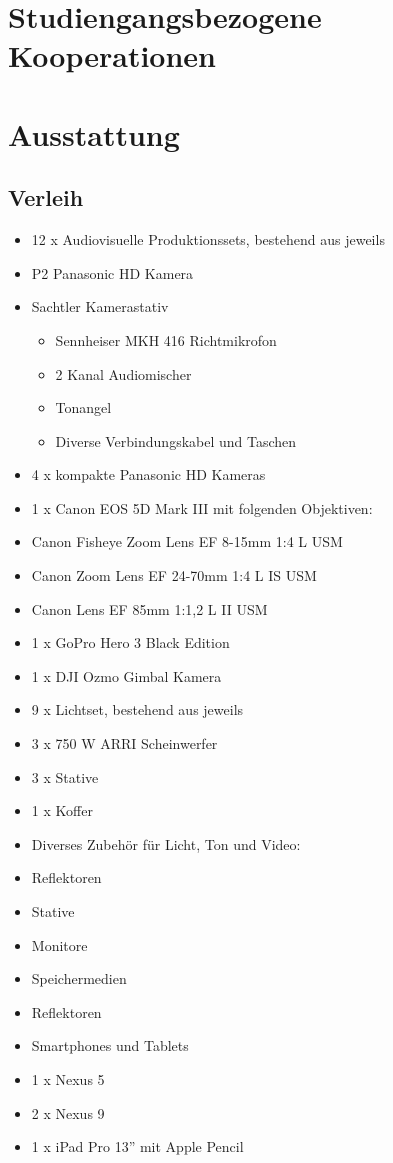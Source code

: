 \chapter{Studiengangsbezogene
Kooperationen}\label{studiengangsbezogene-kooperationen}

\chapter{Ausstattung}\label{ausstattung}

\section{Verleih}\label{verleih}

\begin{itemize}
\item
  12 x Audiovisuelle Produktionssets, bestehend aus jeweils
\item
  P2 Panasonic HD Kamera
\item
  Sachtler Kamerastativ

  \begin{itemize}
  \tightlist
  \item
    Sennheiser MKH 416 Richtmikrofon
  \item
    2 Kanal Audiomischer
  \item
    Tonangel
  \item
    Diverse Verbindungskabel und Taschen
  \end{itemize}
\item
  4 x kompakte Panasonic HD Kameras
\item
  1 x Canon EOS 5D Mark III mit folgenden Objektiven:
\item
  Canon Fisheye Zoom Lens EF 8-15mm 1:4 L USM
\item
  Canon Zoom Lens EF 24-70mm 1:4 L IS USM
\item
  Canon Lens EF 85mm 1:1,2 L II USM
\item
  1 x GoPro Hero 3 Black Edition
\item
  1 x DJI Ozmo Gimbal Kamera
\item
  9 x Lichtset, bestehend aus jeweils
\item
  3 x 750 W ARRI Scheinwerfer
\item
  3 x Stative
\item
  1 x Koffer
\item
  Diverses Zubehör für Licht, Ton und Video:
\item
  Reflektoren
\item
  Stative
\item
  Monitore
\item
  Speichermedien
\item
  Reflektoren
\item
  Smartphones und Tablets
\item
  1 x Nexus 5
\item
  2 x Nexus 9
\item
  1 x iPad Pro 13'' mit Apple Pencil
\end{itemize}


